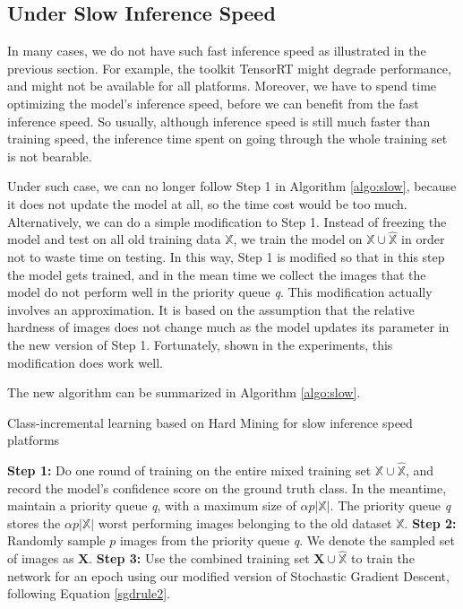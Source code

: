 \subsection{Under Slow Inference Speed}

In many cases, we do not have such fast inference speed as illustrated in the previous section. For example, the toolkit TensorRT might degrade performance, and might not be available for all platforms. Moreover, we have to spend time optimizing the model's inference speed, before we can benefit from the fast inference speed. So usually, although inference speed is still much faster than training speed, the inference time spent on going through the whole training set is not bearable.

Under such case, we can no longer follow Step 1 in Algorithm \ref{algo:slow}, because it does not update the model at all, so the time cost would be too much. Alternatively, we can do a simple modification to Step 1. Instead of freezing the model and test on all old training data $\mathbb{X}$, we train the model on $\mathbb{X}\cup \hat{\mathbb{X}}$ in order not to waste time on testing. In this way, Step 1 is modified so that in this step the model gets trained, and in the mean time we collect the images that the model do not perform well in the priority queue \textit{q}. This modification actually involves an approximation. It is based on the assumption that the relative hardness of images does not change much as the model updates its parameter in the new version of Step 1. Fortunately, shown in the experiments, this modification does work well.

The new algorithm can be summarized in Algorithm \ref{algo:slow}.

\begin{algorithm}
	\caption{Class-incremental learning based on Hard Mining for slow inference speed platforms}
	\label{algo:slow}
	\begin{algorithmic}
		\State \textbf{Step 1:} Do one round of training on the entire mixed training set $\mathbb{X}\cup \hat{\mathbb{X}}$, and record the model's confidence score on the ground truth class. In the meantime, maintain a priority queue \textit{q}, with a maximum size of $\alpha p |\mathbb{X}|$. The priority queue \textit{q} stores the $\alpha p |\mathbb{X}|$ worst performing images belonging to the old dataset $\mathbb{X}$.
		\State \textbf{Step 2:} Randomly sample $p$ images from the priority queue \textit{q}. We denote the sampled set of images as $\mathbf{X}$. 
		\State \textbf{Step 3:} Use the combined training set $\mathbf{X} \cup \hat{\mathbb{X}}$ to train the network for an epoch using our modified version of Stochastic Gradient Descent, following Equation \ref{sgdrule2}.
		\EndFor
	\end{algorithmic}
\end{algorithm}









